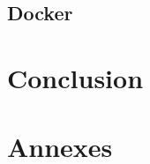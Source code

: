 \documentclass[a4paper,12pt]{article}
\begin{document}
	\subsection{Docker}
	
	\section{Conclusion}
	
	\section{Annexes}
	
	
\end{document}
